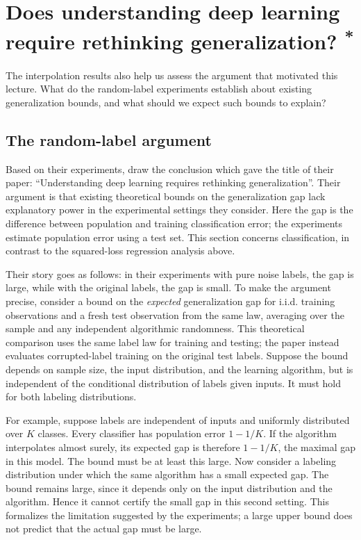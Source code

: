 \documentclass[11pt,twoside]{article}
\newcommand{\suppmark}{\texorpdfstring{\textsuperscript{*}}{*}}
\theoremstyle{definition}
\theoremstyle{remark}
\begin{document}
\section{Does understanding deep learning require rethinking generalization? \suppmark}
\label{sec:rethinking-generalization}

The interpolation results also help us assess the argument that motivated
this lecture. What do the random-label experiments establish about existing
generalization bounds, and what should we expect such bounds to explain?

\subsection{The random-label argument}

Based on their experiments, \citet{zhang2017} draw the conclusion which
gave the title of their paper: ``Understanding deep learning requires rethinking
generalization''. Their argument is that existing theoretical bounds on the
generalization gap lack explanatory power in the experimental settings they
consider. Here the gap is the difference between population and training
classification error; the experiments estimate population error using a test
set. This section concerns classification, in contrast to the squared-loss
regression analysis above.

Their story goes as follows: in their experiments with pure noise labels,
the gap is large, while with the original labels, the gap is small. To make
the argument precise, consider a bound on the \emph{expected} generalization
gap for i.i.d. training observations and a fresh test observation from the
same law, averaging over the sample and any independent algorithmic
randomness. This theoretical comparison uses the same label law for training
and testing; the paper instead evaluates corrupted-label training on the
original test labels. Suppose the bound depends on sample size,
the input distribution, and the learning algorithm, but is independent of the
conditional distribution of labels given inputs. It must hold for both
labeling distributions.

For example, suppose labels are independent of inputs and uniformly
distributed over $K$ classes. Every classifier has population error
$1-1/K$. If the algorithm interpolates almost surely, its expected gap is
therefore $1-1/K$, the maximal gap in this model. The bound must be at least
this large. Now consider a labeling distribution under which the same
algorithm has a small expected gap. The bound remains large, since it depends
only on the input distribution and the algorithm. Hence it cannot certify
the small gap in this second setting. This formalizes the limitation
suggested by the experiments; a large upper bound does not predict that
the actual gap must be large.
\end{document}
